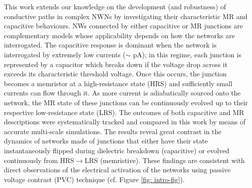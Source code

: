 This work extends our knowledge on the development (and robustness) of conductive paths in complex NWNs by investigating their characteristic MR and capacitive behaviours. NWs connected by either capacitive or MR junctions are complementary models whose applicability depends on how the networks are interrogated. The capacitive response is dominant when the network is interrogated by extremely low currents ($\sim$ pA); in this regime, each junction is represented by a capacitor which breaks down if the voltage drop across it exceeds its characteristic threshold voltage. Once this occurs, the junction becomes a memristor at a high-resistance state (HRS) and sufficiently small currents can flow through it. As more current is adiabatically sourced onto the network, the MR state of these junctions can be continuously evolved up to their respective low-resistance state (LRS). The outcomes of both capacitive and MR descriptions were systematically tracked and compared in this work by means of accurate multi-scale simulations. The results reveal great contrast in the dynamics of networks made of junctions that either have their state instantaneously flipped during dielectric breakdown (capacitive) or evolved continuously from HRS$\rightarrow$LRS (memristive). These findings are consistent with direct observations of the electrical activation of the networks using passive voltage contrast (PVC) technique\cite{gemmill2004} (cf. Figure \ref{fig: intro-fig}). 

